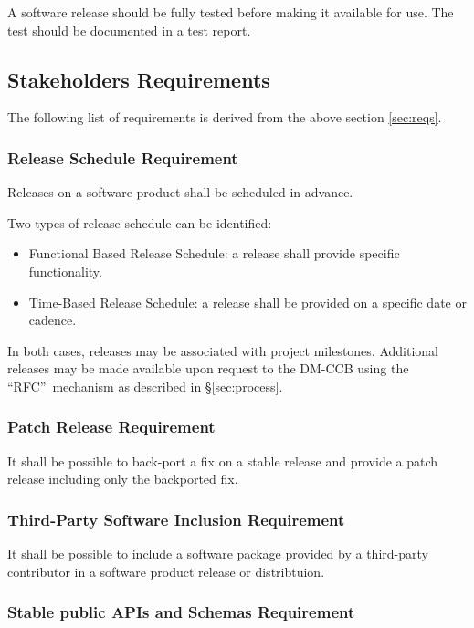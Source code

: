 A software release should be fully tested before making it available for use.
The test should be documented in a test report.


\subsection{Stakeholders Requirements} \label{sec:stakeholdersreqs}

The following list of requirements is derived from the above section \ref{sec:reqs}.


\subsubsection{Release Schedule Requirement} \label{sec:milestone}

Releases on a software product shall be scheduled in advance.

Two types of release schedule can be identified:

\begin{itemize}
\item Functional Based Release Schedule: a release shall provide specific functionality.
\item Time-Based Release Schedule: a release shall be provided on a specific date or cadence.
\end{itemize}

In both cases, releases may be associated with project milestones.
Additional releases may be made available upon request to the DM-CCB using the “RFC” mechanism as described in \S\ref{sec:process}.


\subsubsection{Patch Release Requirement} \label{sec:backport}

It shall be possible to back-port a fix on a stable release and provide a patch release including only the backported fix.


\subsubsection{Third-Party Software Inclusion Requirement} \label{sec:thirdsw}

It shall be possible to include a software package provided by a third-party contributor in a software product release or distribtuion.


\subsubsection{Stable public APIs and Schemas Requirement} \label{sec:stable}

